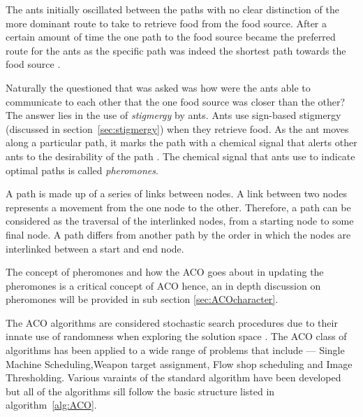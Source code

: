 The ants initially oscillated between the paths with no clear distinction of the more dominant route to take to retrieve food from the food source\cite{AntsAndStigmergy,CompuIntelligenceIntro}. After a certain amount of time the one path to the food source became the preferred route for the ants as the specific path was indeed the shortest path towards the food source \cite{AntsAndStigmergy}.

Naturally the questioned that was asked was how were the ants able to communicate to each other that the one food source was closer than the other? The answer lies in the use of \emph{stigmergy} by ants\cite{AntsAndStigmergy,CompuIntelligenceIntro}. Ants use sign-based stigmergy (discussed in section~\ref{sec:stigmergy}) when they retrieve food\cite{AntIntroTrends,AntsAndStigmergy,CompuIntelligenceIntro}. As the ant moves along a particular path, it marks the path with a chemical signal that alerts other ants to the desirability of the path \cite{CompuIntelligenceIntro}. The chemical signal that ants use to indicate optimal paths is called \emph{pheromones}\cite{AntsAndStigmergy,CompuIntelligenceIntro}.

A path is made up of a series of links between nodes\cite{AIModernApproach,DataStructuresJava}. A link between two nodes represents a movement from the one node to the other\cite{AIModernApproach,DataStructuresJava}. Therefore, a path can be considered as the traversal of the interlinked nodes, from a starting node to some final node\cite{AIModernApproach,DataStructuresJava}. A path differs from another path by the order in which the nodes are interlinked between a start and end node\cite{AIModernApproach,DataStructuresJava}.


The concept of pheromones and how the ACO goes about in updating the pheromones is a critical concept of ACO hence, an in depth discussion on pheromones will be provided in sub section \ref{sec:ACOcharacter}.

The ACO algorithms are considered stochastic search procedures due to their innate use of randomness when exploring the solution space \cite{ACOSurvey,ImpACOComplex}. The ACO class of algorithms has been applied to a wide range of problems that include --- Single Machine Scheduling\cite{ACOSingleMachine},Weapon target assignment\cite{WeaponTargetACO}, Flow shop scheduling\cite{ACOFlowShop} and Image Thresholding\cite{ACOImageThreshold}. Various varaints of the standard algorithm have been developed but all of the algorithms sill follow the basic structure listed in algorithm~\ref{alg:ACO}\cite{CompuIntelligenceIntro,FundamentalSwarm}.

